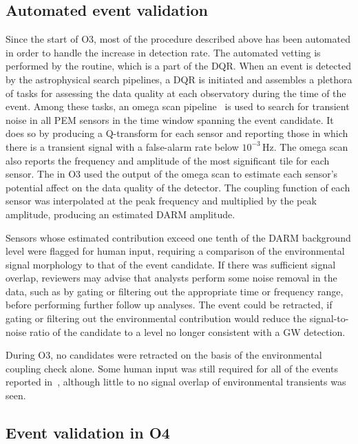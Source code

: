 \subsection{Automated event validation}

Since the start of \ac{O3}, most of the procedure described above has been automated in order to handle the increase in detection rate.
The automated vetting is performed by the  routine, which is a part of the \ac{DQR}.
When an event is detected by the astrophysical search pipelines, a \ac{DQR} is initiated and assembles a plethora of tasks for assessing the data quality at each observatory during the time of the event.
Among these tasks, an omega scan pipeline~\citep{Davis_2021, Chatterji_2004} is used to search for transient noise in all \ac{PEM} sensors in the time window spanning the event candidate.
It does so by producing a Q-transform for each sensor and reporting those in which there is a transient signal with a false-alarm rate below $10^{-3}$\,Hz.
The omega scan also reports the frequency and amplitude of the most significant tile for each sensor.
The  in \ac{O3} used the output of the omega scan to estimate each sensor's potential affect on the data quality of the detector.
The coupling function of each sensor was interpolated at the peak frequency and multiplied by the peak amplitude, producing an estimated \ac{DARM} amplitude.

Sensors whose estimated contribution exceed one tenth of the \ac{DARM} background level were flagged for human input, requiring a comparison of the environmental signal morphology to that of the event candidate.
If there was sufficient signal overlap, reviewers may advise that analysts perform some noise removal in the data, such as by gating or filtering out the appropriate time or frequency range, before performing further follow up analyses.
The event could be retracted, if gating or filtering out the environmental contribution would reduce the signal-to-noise ratio of the candidate to a level no longer consistent with a GW detection.

During \ac{O3}, no candidates were retracted on the basis of the environmental coupling check alone.
Some human input was still required for all of the \XX events reported in~\citep{gwtc2}, although little to no signal overlap of environmental transients was seen.

\subsection{Event validation in O4}

